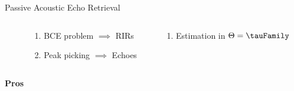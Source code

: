 \begin{frame}[t]{\alert{Passive} Acoustic Echo Retrieval \hfill\faPalette}
        \vspace{.5em}
        \begin{columns}[T,onlytextwidth] %
            \begin{column}{.02\textwidth}
            \end{column}

            \begin{column}{.48\textwidth}
                \begin{enumerate}
                    \item BCE problem $\implies$ RIRs
                    \item Peak picking $\implies$ Echoes
                \end{enumerate}
            \end{column}
            \begin{column}{.48\textwidth}
                \begin{enumerate}
                    \item Estimation in $\Theta = \tauFamily$ %
                \end{enumerate}
            \end{column}%
        \end{columns}

        \vspace{1em}
        \begin{columns}[onlytextwidth] %
            \begin{column}{.02\textwidth}
                \textcolor{mygreen}{\textbf{Pros}}
            \end{column}


\end{columns}
\end{frame}

